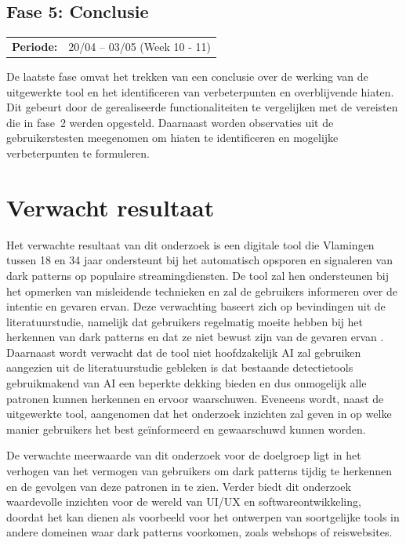 \vspace{1em}

\subsection{Fase 5: Conclusie}
\label{subsec:conclusie}

\begin{tabular}{ll}
    \hspace{0.3em} \textbf{Periode:} & 20/04 – 03/05 (Week 10 - 11)
\end{tabular}

\vspace{1em}

De laatste fase omvat het trekken van een conclusie over de werking van de uitgewerkte tool en het identificeren van verbeterpunten en overblijvende hiaten. Dit gebeurt door de gerealiseerde functionaliteiten te vergelijken met de vereisten die in fase~2 werden opgesteld. Daarnaast worden observaties uit de gebruikerstesten meegenomen om hiaten te identificeren en mogelijke verbeterpunten te formuleren.

\vspace{1em}


\section{Verwacht resultaat}%
\label{sec:verwachte_resultaten}

Het verwachte resultaat van dit onderzoek is een digitale tool die Vlamingen tussen 18 en 34 jaar ondersteunt bij het automatisch opsporen en signaleren van dark patterns op populaire streamingdiensten. De tool zal hen ondersteunen bij het opmerken van misleidende technieken en zal de gebruikers informeren over de intentie en gevaren ervan. Deze verwachting baseert zich op bevindingen uit de literatuurstudie, namelijk dat gebruikers regelmatig moeite hebben bij het herkennen van dark patterns \autocite{OECD2022} en dat ze niet bewust zijn van de gevaren ervan \autocite{BongardBlanchy2021}. Daarnaast wordt verwacht dat de tool niet hoofdzakelijk AI zal gebruiken aangezien uit de literatuurstudie gebleken is dat bestaande detectietools gebruikmakend van AI een beperkte dekking bieden \autocite{Nie2024} en dus onmogelijk alle patronen kunnen herkennen en ervoor waarschuwen. Eveneens wordt, naast de uitgewerkte tool, aangenomen dat het onderzoek inzichten zal geven in op welke manier gebruikers het best geïnformeerd en gewaarschuwd kunnen worden. 

\vspace{1em}

De verwachte meerwaarde van dit onderzoek voor de doelgroep ligt in het verhogen van het vermogen van gebruikers om dark patterns tijdig te herkennen en de gevolgen van deze patronen in te zien. Verder biedt dit onderzoek waardevolle inzichten voor de wereld van UI/UX en softwareontwikkeling, doordat het kan dienen als voorbeeld voor het ontwerpen van soortgelijke tools in andere domeinen waar dark patterns voorkomen, zoals webshops of reiswebsites.

\vspace{1em}
